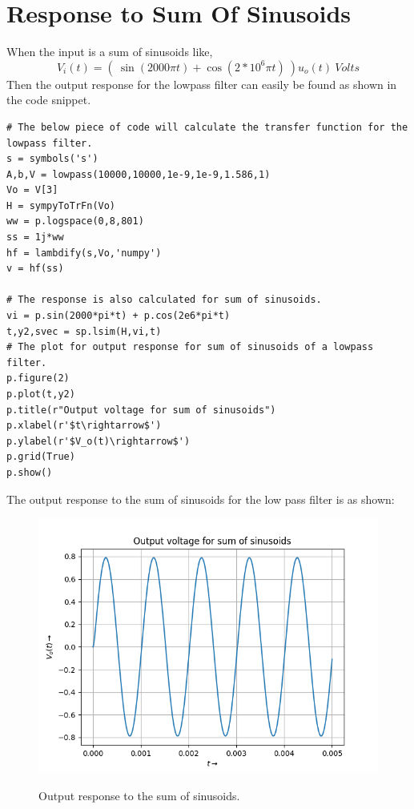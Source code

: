 \documentclass[11pt, a4paper]{article}
\begin{document}
\section*{Response to Sum Of Sinusoids}   
    When the input is a sum of sinusoids like,
\begin{equation*}
  V_{i}(t) = ( \ \sin(2000\pi t) + \cos(2*10^{6}\pi t) \ )u_{o}(t) \ Volts
  \end{equation*}
  Then the output response for the lowpass filter can easily be found as shown in the code snippet.
  \begin{verbatim}
# The below piece of code will calculate the transfer function for the lowpass filter.
s = symbols('s')
A,b,V = lowpass(10000,10000,1e-9,1e-9,1.586,1)
Vo = V[3]
H = sympyToTrFn(Vo)
ww = p.logspace(0,8,801)
ss = 1j*ww
hf = lambdify(s,Vo,'numpy')
v = hf(ss)

# The response is also calculated for sum of sinusoids.
vi = p.sin(2000*pi*t) + p.cos(2e6*pi*t)
t,y2,svec = sp.lsim(H,vi,t)
# The plot for output response for sum of sinusoids of a lowpass filter.
p.figure(2)
p.plot(t,y2)
p.title(r"Output voltage for sum of sinusoids")
p.xlabel(r'$t\rightarrow$')
p.ylabel(r'$V_o(t)\rightarrow$')
p.grid(True)
p.show()
  \end{verbatim}
The output response to the sum of sinusoids for the low pass filter is as shown:
\begin{figure}[!tbh]
   	\centering
   	\includegraphics[scale=0.6]{Figure_2.png}
   	\label{fig:32}
   	\caption{Output response to the sum of sinusoids.}
   \end{figure}
   \newpage
\end{document}
